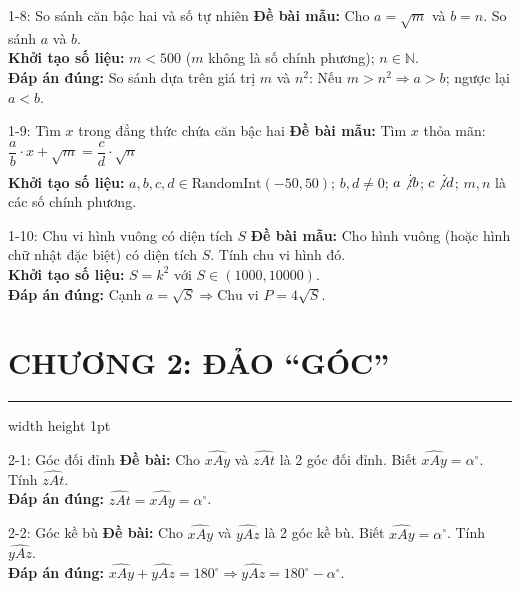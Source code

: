 \documentclass[11pt, a4paper]{article}
\begin{document}
\begin{qbox}{1-8: So sánh căn bậc hai và số tự nhiên}
\textbf{Đề bài mẫu:} Cho $a = \sqrt{m}$ và $b = n$. So sánh $a$ và $b$. \\[0.3em]
\textbf{Khởi tạo số liệu:} $m < 500$ ($m$ không là số chính phương); $n \in \mathbb{N}$. \\[0.3em]
\textbf{Đáp án đúng:} So sánh dựa trên giá trị $m$ và $n^2$: Nếu $m > n^2 \Rightarrow a > b$; ngược lại $a < b$.
\end{qbox}

\begin{qbox}{1-9: Tìm $x$ trong đẳng thức chứa căn bậc hai}
\textbf{Đề bài mẫu:} Tìm $x$ thỏa mãn: $\dfrac{a}{b} \cdot x + \sqrt{m} = \dfrac{c}{d} \cdot \sqrt{n}$ \\[0.3em]
\textbf{Khởi tạo số liệu:} $a, b, c, d \in \text{RandomInt}(-50, 50)$; $b, d \neq 0$; $a \not\vdots b$; $c \not\vdots d$; $m, n$ là các số chính phương.
\end{qbox}

\begin{qbox}{1-10: Chu vi hình vuông có diện tích $S$}
\textbf{Đề bài mẫu:} Cho hình vuông (hoặc hình chữ nhật đặc biệt) có diện tích $S$. Tính chu vi hình đó. \\[0.3em]
\textbf{Khởi tạo số liệu:} $S = k^2$ với $S \in (1000, 10000)$. \\[0.3em]
\textbf{Đáp án đúng:} Cạnh $a = \sqrt{S} \Rightarrow \text{Chu vi } P = 4\sqrt{S}$.
\end{qbox}

\pagebreak

\section*{\Large \color{primary} CHƯƠNG 2: ĐẢO “GÓC”}
\hrule width \hsize height 1pt
\vspace{1em}

\begin{qbox}{2-1: Góc đối đỉnh}
\textbf{Đề bài:} Cho $\widehat{xAy}$ và $\widehat{zAt}$ là 2 góc đối đỉnh. Biết $\widehat{xAy} = \alpha^\circ$. Tính $\widehat{zAt}$. \\[0.3em]
\textbf{Đáp án đúng:} $\widehat{zAt} = \widehat{xAy} = \alpha^\circ$.
\end{qbox}

\begin{qbox}{2-2: Góc kề bù}
\textbf{Đề bài:} Cho $\widehat{xAy}$ và $\widehat{yAz}$ là 2 góc kề bù. Biết $\widehat{xAy} = \alpha^\circ$. Tính $\widehat{yAz}$. \\[0.3em]
\textbf{Đáp án đúng:} $\widehat{xAy} + \widehat{yAz} = 180^\circ \Rightarrow \widehat{yAz} = 180^\circ - \alpha^\circ$.
\end{qbox}
\end{document}
